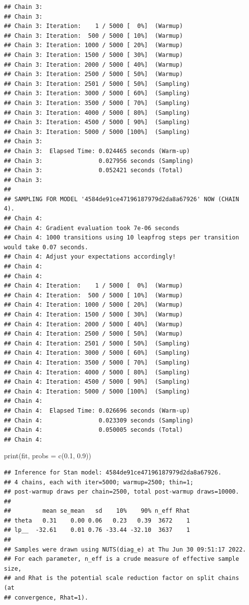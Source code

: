 \documentclass[
  12pt,
]{book}
\newenvironment{Shaded}{\begin{snugshade}}{\end{snugshade}}
\newcommand{\AttributeTok}[1]{\textcolor[rgb]{0.77,0.63,0.00}{#1}}
\newcommand{\FloatTok}[1]{\textcolor[rgb]{0.00,0.00,0.81}{#1}}
\newcommand{\FunctionTok}[1]{\textcolor[rgb]{0.00,0.00,0.00}{#1}}
\newcommand{\NormalTok}[1]{#1}
\theoremstyle{definition}
\theoremstyle{definition}
\theoremstyle{definition}
\theoremstyle{definition}
\theoremstyle{remark}
\begin{document}
\begin{verbatim}
## Chain 3: 
## Chain 3: 
## Chain 3: Iteration:    1 / 5000 [  0%]  (Warmup)
## Chain 3: Iteration:  500 / 5000 [ 10%]  (Warmup)
## Chain 3: Iteration: 1000 / 5000 [ 20%]  (Warmup)
## Chain 3: Iteration: 1500 / 5000 [ 30%]  (Warmup)
## Chain 3: Iteration: 2000 / 5000 [ 40%]  (Warmup)
## Chain 3: Iteration: 2500 / 5000 [ 50%]  (Warmup)
## Chain 3: Iteration: 2501 / 5000 [ 50%]  (Sampling)
## Chain 3: Iteration: 3000 / 5000 [ 60%]  (Sampling)
## Chain 3: Iteration: 3500 / 5000 [ 70%]  (Sampling)
## Chain 3: Iteration: 4000 / 5000 [ 80%]  (Sampling)
## Chain 3: Iteration: 4500 / 5000 [ 90%]  (Sampling)
## Chain 3: Iteration: 5000 / 5000 [100%]  (Sampling)
## Chain 3: 
## Chain 3:  Elapsed Time: 0.024465 seconds (Warm-up)
## Chain 3:                0.027956 seconds (Sampling)
## Chain 3:                0.052421 seconds (Total)
## Chain 3: 
## 
## SAMPLING FOR MODEL '4584de91ce47196187979d2da8a67926' NOW (CHAIN 4).
## Chain 4: 
## Chain 4: Gradient evaluation took 7e-06 seconds
## Chain 4: 1000 transitions using 10 leapfrog steps per transition would take 0.07 seconds.
## Chain 4: Adjust your expectations accordingly!
## Chain 4: 
## Chain 4: 
## Chain 4: Iteration:    1 / 5000 [  0%]  (Warmup)
## Chain 4: Iteration:  500 / 5000 [ 10%]  (Warmup)
## Chain 4: Iteration: 1000 / 5000 [ 20%]  (Warmup)
## Chain 4: Iteration: 1500 / 5000 [ 30%]  (Warmup)
## Chain 4: Iteration: 2000 / 5000 [ 40%]  (Warmup)
## Chain 4: Iteration: 2500 / 5000 [ 50%]  (Warmup)
## Chain 4: Iteration: 2501 / 5000 [ 50%]  (Sampling)
## Chain 4: Iteration: 3000 / 5000 [ 60%]  (Sampling)
## Chain 4: Iteration: 3500 / 5000 [ 70%]  (Sampling)
## Chain 4: Iteration: 4000 / 5000 [ 80%]  (Sampling)
## Chain 4: Iteration: 4500 / 5000 [ 90%]  (Sampling)
## Chain 4: Iteration: 5000 / 5000 [100%]  (Sampling)
## Chain 4: 
## Chain 4:  Elapsed Time: 0.026696 seconds (Warm-up)
## Chain 4:                0.023309 seconds (Sampling)
## Chain 4:                0.050005 seconds (Total)
## Chain 4:
\end{verbatim}

\begin{Shaded}
\begin{Highlighting}[]
\FunctionTok{print}\NormalTok{(fit, }\AttributeTok{probs =} \FunctionTok{c}\NormalTok{(}\FloatTok{0.1}\NormalTok{, }\FloatTok{0.9}\NormalTok{))}
\end{Highlighting}
\end{Shaded}

\begin{verbatim}
## Inference for Stan model: 4584de91ce47196187979d2da8a67926.
## 4 chains, each with iter=5000; warmup=2500; thin=1; 
## post-warmup draws per chain=2500, total post-warmup draws=10000.
## 
##         mean se_mean   sd    10%    90% n_eff Rhat
## theta   0.31    0.00 0.06   0.23   0.39  3672    1
## lp__  -32.61    0.01 0.76 -33.44 -32.10  3637    1
## 
## Samples were drawn using NUTS(diag_e) at Thu Jun 30 09:51:17 2022.
## For each parameter, n_eff is a crude measure of effective sample size,
## and Rhat is the potential scale reduction factor on split chains (at 
## convergence, Rhat=1).
\end{verbatim}
\end{document}
